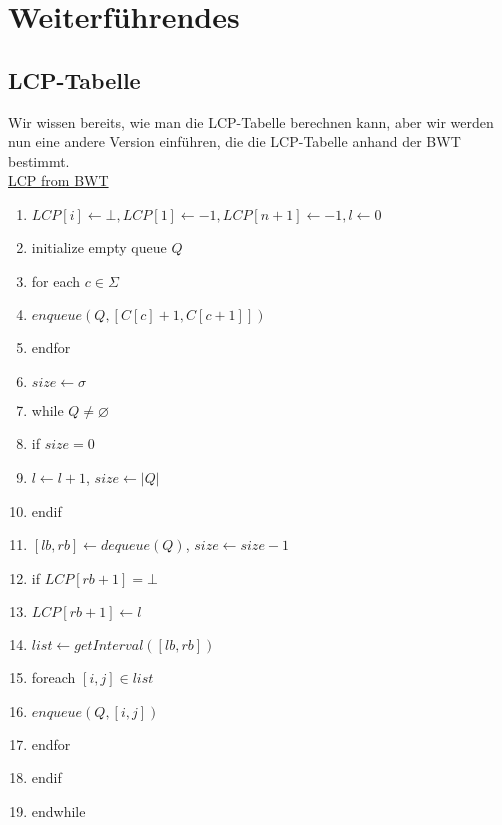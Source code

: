 \documentclass[a4paper, 12pt]{article}
\theoremstyle{plain}
\theoremstyle{definition}
\theoremstyle{lemma}
\theoremstyle{remark}
\theoremstyle{corollary}
\theoremstyle{example}
\begin{document}
	\section{Weiterführendes}
	\subsection{LCP-Tabelle}
	Wir wissen bereits, wie man die LCP-Tabelle berechnen kann, aber wir werden nun eine andere Version einführen, die die LCP-Tabelle anhand der BWT bestimmt.\\
	\underline{LCP from BWT}
	\begin{enumerate}
		\item $LCP[i]\gets \bot, LCP[1]\gets -1, LCP[n+1]\gets -1, l \gets 0$
		\item initialize empty queue $Q$
		\item for each $c \in \Sigma$
		\item $enqueue(Q,[C[c]+1,C[c+1]])$
		\item endfor 
		\item $size \gets \sigma$
		\item while $Q\neq \varnothing$
		\item if $size = 0$
		\item $l\gets l+1$, $size \gets \left|Q\right|$
		\item endif
		\item $[lb,rb] \gets dequeue(Q)$, $size \gets size-1$
		\item if $LCP[rb+1] = \bot$
		\item $LCP[rb+1] \gets l$
		\item $list \gets getInterval([lb,rb])$
		\item foreach $[i,j] \in list$
		\item $enqueue(Q,[i,j])$
		\item endfor
		\item endif 
		\item endwhile
	\end{enumerate}
\end{document}
